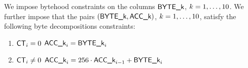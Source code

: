 We impose bytehood constraints on the columns $\textsf{BYTE}\textsf{\_k}$, $k=1,\dots,10$. We further impose that the pairs $(\textsf{BYTE}\textsf{\_k}, \textsf{ACC}\textsf{\_k})$, $k=1,\dots,10$, satisfy the following byte decompositions constraints:
\begin{enumerate}
	\item \If $\textsf{CT}_{i} =    0$ \Then $\textsf{ACC}\textsf{\_k}_{i} = \textsf{BYTE}\textsf{\_k}_{i}$
	\item \If $\textsf{CT}_{i} \neq 0$ \Then $\textsf{ACC}\textsf{\_k}_{i} = 256 \cdot \textsf{ACC}\textsf{\_k}_{i-1} + \textsf{BYTE}\textsf{\_k}_{i}$
\end{enumerate}